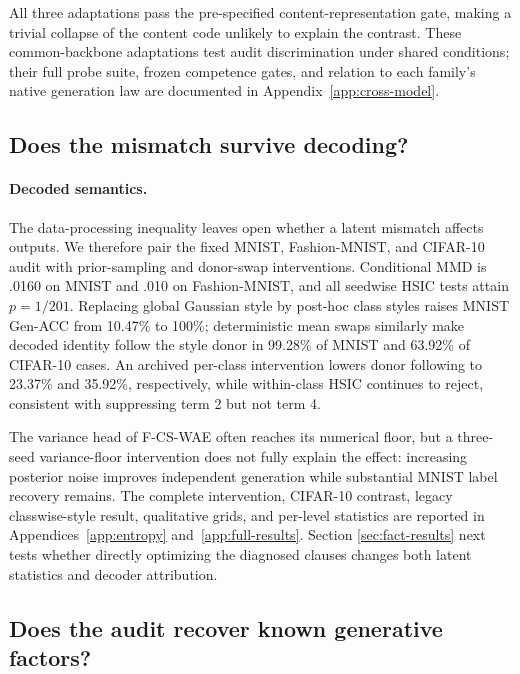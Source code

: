 \documentclass{article}
\begin{document}
All three adaptations pass the pre-specified content-representation gate,
making a trivial collapse of the content code unlikely to explain the contrast.
These common-backbone adaptations test audit discrimination under shared conditions; their full
probe suite, frozen competence gates, and relation to each family's native
generation law are documented in Appendix~\ref{app:cross-model}.
\FloatBarrier

\subsection{Does the mismatch survive decoding?}
\label{sec:entropy}

\paragraph{Decoded semantics.}
The data-processing inequality leaves open whether a latent mismatch affects
outputs.  We therefore pair the fixed MNIST, Fashion-MNIST, and CIFAR-10 audit
with prior-sampling and donor-swap interventions.  Conditional MMD is .0160 on
MNIST and .010 on Fashion-MNIST, and all seedwise HSIC tests attain $p=1/201$.
Replacing global Gaussian style by post-hoc class styles raises MNIST Gen-ACC
from 10.47\% to 100\%; deterministic mean swaps similarly make decoded
identity follow the style donor in 99.28\% of MNIST and 63.92\% of CIFAR-10
cases.  An archived per-class intervention lowers donor following to 23.37\%
and 35.92\%, respectively, while within-class HSIC continues to reject,
consistent with suppressing term 2 but not term 4.

The variance head of F-CS-WAE often reaches its numerical floor, but a
three-seed variance-floor intervention does not fully explain the effect:
increasing posterior noise improves independent generation while substantial
MNIST label recovery remains.  The complete intervention, CIFAR-10 contrast,
legacy classwise-style result, qualitative grids, and per-level statistics are
reported in Appendices~\ref{app:entropy} and~\ref{app:full-results}.  Section
\ref{sec:fact-results} next tests whether directly optimizing the diagnosed
clauses changes both latent statistics and decoder attribution.

\subsection{Does the audit recover known generative factors?}
\label{sec:shapes3d}
\end{document}
